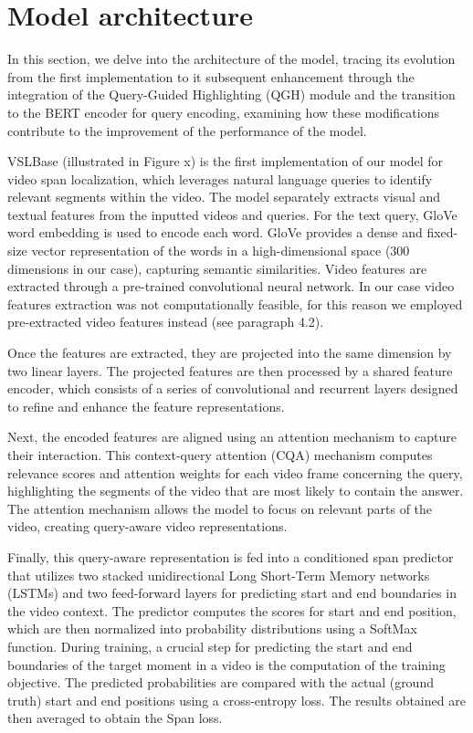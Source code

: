 \documentclass[conference]{IEEEtran}
\begin{document}
\section{Model architecture}
In this section, we delve into the architecture of the model, tracing its evolution from the first implementation to it subsequent enhancement through the integration of the Query-Guided Highlighting (QGH) module and the transition to the BERT encoder for query encoding, examining how these modifications contribute to the improvement of the performance of the model.

VSLBase (illustrated in Figure x) is the first implementation of our model for video span localization, which leverages natural language queries to identify relevant segments within the video.  The model separately extracts visual and textual features from the inputted videos and queries. For the text query, GloVe word embedding is used to encode each word. GloVe provides a dense and fixed-size vector representation of the words in a high-dimensional space (300 dimensions in our case), capturing semantic similarities. Video features are extracted through a pre-trained convolutional neural network. In our case video features extraction was not computationally feasible, for this reason we employed pre-extracted video features instead (see paragraph 4.2). 

Once the features are extracted, they are projected into the same dimension by two linear layers. The projected features are then processed by a shared feature encoder, which consists of a series of convolutional and recurrent layers designed to refine and enhance the feature representations.

Next, the encoded features are aligned using an attention mechanism to capture their interaction. This context-query attention (CQA) mechanism computes relevance scores and attention weights for each video frame concerning the query, highlighting the segments of the video that are most likely to contain the answer. The attention mechanism allows the model to focus on relevant parts of the video, creating query-aware video representations.

Finally, this query-aware representation is fed into a conditioned span predictor that utilizes two stacked unidirectional Long Short-Term Memory networks (LSTMs) and two feed-forward layers for predicting start and end boundaries in the video context. The predictor computes the scores for start and end position, which are then normalized into probability distributions using a SoftMax function. During training, a crucial step for predicting the start and end boundaries of the target moment in a video is the computation of the training objective. The predicted probabilities are compared with the actual (ground truth) start and end positions using a cross-entropy loss. The results obtained are then averaged to obtain the Span loss.
\end{document}
